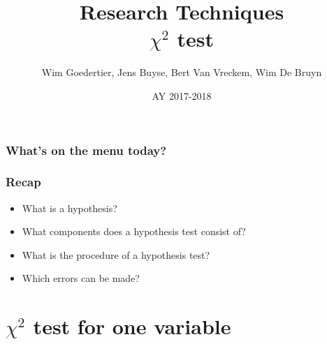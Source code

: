 \documentclass{beamer}
\title[Intro]{Research Techniques\\$\chi^{2}$ test}
\author{Wim Goedertier, Jens Buyse, Bert {Van Vreckem}, Wim {De Bruyn}}
\date{AY 2017-2018}
\begin{document}

\HoGentLogo

\titleframe





\begin{frame}
  \frametitle{What's on the menu today?}

  \tableofcontents
\end{frame}

\begin{frame}
  \frametitle{Recap}

  \begin{itemize}
    \item What is a hypothesis?
    \item What components does a hypothesis test consist of?
    \item What is the procedure of a hypothesis test?
    \item Which errors can be made?
  \end{itemize}
\end{frame}

\section{$\chi^{2}$ test for one variable}
\sectionframelogo{}
\end{document}
